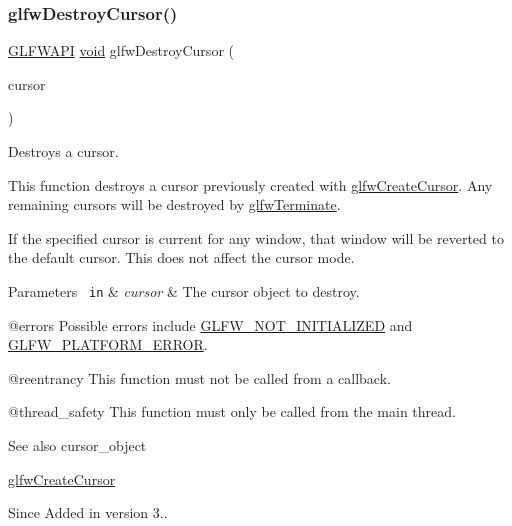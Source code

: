 \subsubsection{\texorpdfstring{glfwDestroyCursor()}{glfwDestroyCursor()}}
{\footnotesize\ttfamily \mbox{\hyperlink{glfw3_8h_a56da5036b2cc259351ae22fd6439bb47}{G\+L\+F\+W\+A\+PI}} \mbox{\hyperlink{glad_8h_a950fc91edb4504f62f1c577bf4727c29}{void}} glfw\+Destroy\+Cursor (\begin{DoxyParamCaption}\item[{\mbox{\hyperlink{glfw3_8h_a89261ae18c75e863aaf2656ecdd238f4}{G\+L\+F\+Wcursor}} $\ast$}]{cursor }\end{DoxyParamCaption})}



Destroys a cursor. 

This function destroys a cursor previously created with \mbox{\hyperlink{group__input_gac0f0f691f2d110f9acfb4bfe07f1216c}{glfw\+Create\+Cursor}}. Any remaining cursors will be destroyed by \mbox{\hyperlink{group__init_gafd90e6fd4819ea9e22e5e739519a6504}{glfw\+Terminate}}.

If the specified cursor is current for any window, that window will be reverted to the default cursor. This does not affect the cursor mode.


\begin{DoxyParams}[1]{Parameters}
\mbox{\texttt{ in}}  & {\em cursor} & The cursor object to destroy.\\
\hline
\end{DoxyParams}
@errors Possible errors include \mbox{\hyperlink{group__errors_ga2374ee02c177f12e1fa76ff3ed15e14a}{G\+L\+F\+W\+\_\+\+N\+O\+T\+\_\+\+I\+N\+I\+T\+I\+A\+L\+I\+Z\+ED}} and \mbox{\hyperlink{group__errors_gad44162d78100ea5e87cdd38426b8c7a1}{G\+L\+F\+W\+\_\+\+P\+L\+A\+T\+F\+O\+R\+M\+\_\+\+E\+R\+R\+OR}}.

@reentrancy This function must not be called from a callback.

@thread\+\_\+safety This function must only be called from the main thread.

\begin{DoxySeeAlso}{See also}
cursor\+\_\+object 

\mbox{\hyperlink{group__input_gac0f0f691f2d110f9acfb4bfe07f1216c}{glfw\+Create\+Cursor}}
\end{DoxySeeAlso}
\begin{DoxySince}{Since}
Added in version 3.. 
\end{DoxySince}
\mbox{\label{group__input_ga3ac90c8bbaf0b46063bb02b574f3b6f7}} 
